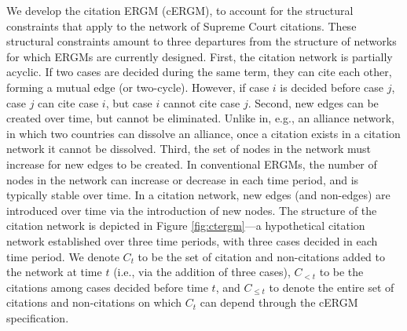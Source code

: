 \documentclass[headsepline=true, abstracton]{scrartcl}
\begin{document}
We develop the citation ERGM (cERGM), to account for the structural constraints that apply to the network of Supreme Court citations. These structural constraints amount to three departures from the structure of networks for which ERGMs are currently designed. First, the citation network is partially acyclic. If two cases are decided during the same term, they can cite each other, forming a mutual edge (or two-cycle). However, if case $i$ is decided before case $j$, case $j$ can cite case $i$, but case $i$ cannot cite case $j$. Second, new edges can be created over time, but cannot be eliminated. Unlike in, e.g., an alliance network, in which two countries can dissolve an alliance, once a citation exists in a citation network it cannot be dissolved. Third, the set of nodes in the network must increase for new edges to be created. In conventional ERGMs, the number of nodes in the network can increase or decrease in each time period, and is typically stable over time. In a citation network, new edges (and non-edges) are introduced over time via the introduction of new nodes. The structure of the citation network is depicted in Figure \ref{fig:ctergm}---a hypothetical citation network established over three time periods, with three cases decided in each time period. We denote $C_t$ to be the set of citation and non-citations added to the network at time $t$ (i.e., via the addition of three cases), $C_{ <t}$ to be the citations among cases decided before time $t$, and $C_{ \leq t}$ to denote the entire set of citations and non-citations on which $C_t$ can depend through the cERGM specification.
\end{document}
